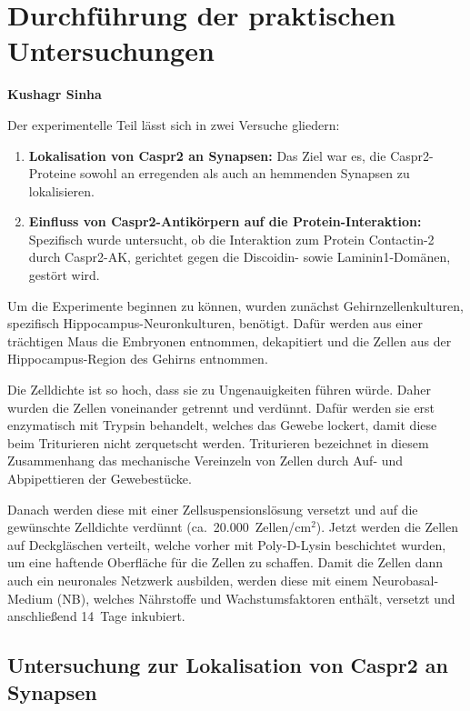 \chapter{Durchführung der praktischen Untersuchungen}
\textbf{Kushagr Sinha}


Der experimentelle Teil lässt sich in zwei Versuche gliedern:

\begin{enumerate}
	\item \textbf{Lokalisation von Caspr2 an Synapsen:} Das Ziel war es,
	die Caspr2-Proteine sowohl an erregenden als auch an
	hemmenden Synapsen zu lokalisieren.
	\item \textbf{Einfluss von Caspr2-Antikörpern auf die
		Protein-Interaktion:} Spezifisch wurde untersucht, ob die
	Interaktion zum Protein Contactin-2 durch Caspr2-AK, gerichtet
	gegen die Discoidin- sowie Laminin1-Domänen, gestört wird.
\end{enumerate}

Um die Experimente beginnen zu können, wurden zunächst
Gehirnzellenkulturen, spezifisch Hippocampus-Neuronkulturen, benötigt. Dafür
werden aus einer trächtigen Maus die Embryonen entnommen, dekapitiert
und die Zellen aus der Hippocampus-Region des Gehirns entnommen.

Die Zelldichte ist so hoch, dass sie zu Ungenauigkeiten führen würde. Daher wurden die Zellen voneinander getrennt und verdünnt. Dafür
werden sie erst enzymatisch mit Trypsin behandelt, welches das Gewebe
lockert, damit diese beim Triturieren nicht zerquetscht werden.
Triturieren bezeichnet in diesem Zusammenhang das mechanische Vereinzeln
von Zellen durch Auf- und Abpipettieren der Gewebestücke.

Danach werden diese mit einer Zellsuspensionslösung versetzt und auf die
gewünschte Zelldichte verdünnt (ca.\ 20.000~Zellen/cm$^2$). Jetzt
werden die Zellen auf Deckgläschen verteilt, welche vorher mit
Poly-D-Lysin beschichtet wurden, um eine haftende Oberfläche für die
Zellen zu schaffen. Damit die Zellen dann auch ein neuronales Netzwerk
ausbilden, werden diese mit einem Neurobasal-Medium (NB), welches
Nährstoffe und Wachstumsfaktoren enthält, versetzt und anschließend 14~Tage
inkubiert.


\section{Untersuchung zur Lokalisation von Caspr2 an Synapsen}

